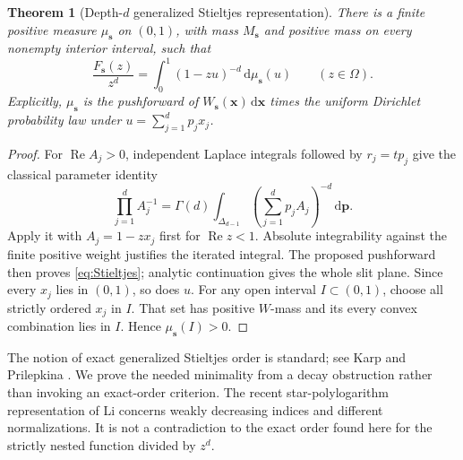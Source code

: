 \documentclass[11pt]{article}
\numberwithin{equation}{section}
\newtheorem{theorem}{Theorem}[section]
\theoremstyle{definition}
\theoremstyle{remark}
\DeclareMathOperator{\Repart}{Re}
\newcommand{\dd}{\,\mathrm d}
\newcommand{\cut}{\Omega}
\newcommand{\sv}{\boldsymbol s}
\newcommand{\xv}{\boldsymbol x}
\newcommand{\pv}{\boldsymbol p}
\begin{document}
\begin{theorem}[Depth-$d$ generalized Stieltjes representation]
\label{thm:Stieltjesrepresentation}
There is a finite positive measure $\mu_{\sv}$ on $(0,1)$, with mass
$M_{\sv}$ and positive mass on every nonempty interior interval, such that
\begin{equation}\label{eq:Stieltjes}
 \frac{F_{\sv}(z)}{z^d}
 =\int_0^1(1-zu)^{-d}\dd\mu_{\sv}(u)\qquad(z\in\cut).
\end{equation}
Explicitly, $\mu_{\sv}$ is the pushforward of
$W_{\sv}(\xv)\dd\xv$ times the uniform Dirichlet probability law under
$u=\sum_{j=1}^dp_jx_j$.
\end{theorem}
\begin{proof}
For $\Repart A_j>0$, independent Laplace integrals followed by
$r_j=tp_j$ give the classical parameter identity
\begin{equation}\label{eq:Feynman}
 \prod_{j=1}^dA_j^{-1}
 =\Gamma(d)\int_{\Delta_{d-1}}
              \left(\sum_{j=1}^dp_jA_j\right)^{-d}\dd\pv.
\end{equation}
Apply it with $A_j=1-zx_j$ first for $\Repart z<1$. Absolute
integrability against the finite positive weight justifies the
iterated integral. The proposed pushforward then proves
\eqref{eq:Stieltjes}; analytic continuation gives the whole slit plane.
Since every $x_j$ lies in $(0,1)$, so does $u$.
For any open interval $I\subset(0,1)$, choose all strictly ordered
$x_j$ in $I$. That set has positive $W$-mass and its every convex
combination lies in $I$. Hence $\mu_{\sv}(I)>0$.
\end{proof}

The notion of exact generalized Stieltjes order is standard; see
Karp and Prilepkina \cite{karp-prilepkina}. We prove the needed minimality
from a decay obstruction rather than invoking an exact-order criterion.
The recent star-polylogarithm representation of Li \cite{li-star}
concerns weakly decreasing indices and different normalizations. It is
not a contradiction to the exact order found here for the strictly
nested function divided by $z^d$.
\end{document}
